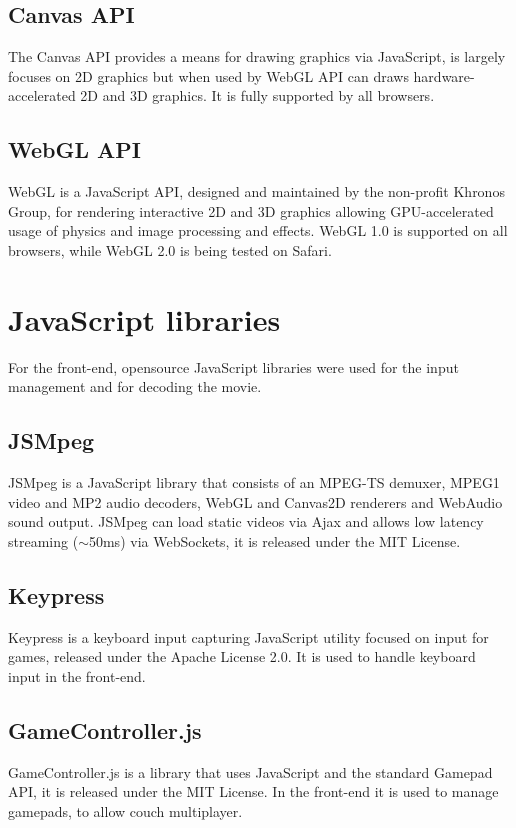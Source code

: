 \subsection{Canvas API}
The Canvas API provides a means for drawing graphics via JavaScript, is largely focuses on 2D graphics but when used by WebGL API can draws hardware-accelerated 2D and 3D graphics. It is fully supported by all browsers\cite{Canvas_API}.

\subsection{WebGL API}
WebGL is a JavaScript API, designed and maintained by the non-profit Khronos Group, for rendering interactive 2D and 3D graphics allowing GPU-accelerated usage of physics and image processing and effects. WebGL 1.0 is supported on all browsers, while WebGL 2.0 is being tested on Safari\cite{WebGL}.



\section{JavaScript libraries}
For the front-end, opensource JavaScript libraries were used for the input management and for decoding the movie.

\subsection{JSMpeg}
JSMpeg is a JavaScript library that consists of an MPEG-TS demuxer, MPEG1 video and MP2 audio decoders, WebGL and Canvas2D renderers and WebAudio sound output. JSMpeg can load static videos via Ajax and allows low latency streaming ($\sim$50ms) via WebSockets, it is released under the MIT License\cite{JSMpeg}.

\subsection{Keypress}
Keypress is a keyboard input capturing JavaScript utility focused on input for games, released under the Apache License 2.0. It is used to handle keyboard input in the front-end\cite{Keypress}.

\subsection{GameController.js}
GameController.js is a library that uses JavaScript and the standard Gamepad API, it is released under the MIT License. In the front-end it is used to manage gamepads, to allow couch multiplayer\cite{gameController_js}.